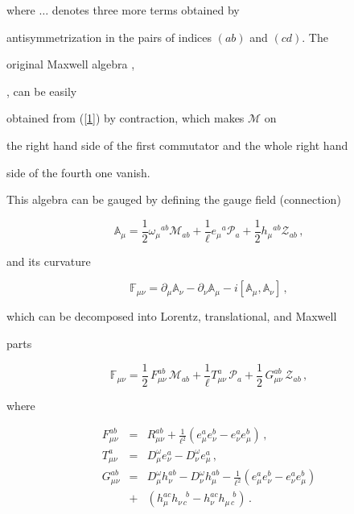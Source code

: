 \documentclass [prd,reprint,eqsecnum,nofootinbib]  {revtex4-1}
\begin{document}
where $\ldots$ denotes three more terms obtained by

antisymmetrization in the pairs of indices $(ab)$ and $(cd)$. The

original Maxwell algebra \cite{Soroka:2006aj},

\cite{Bonanos:2010fw}, \cite{Lukierski:2010dy} can be easily

obtained from (\ref{1}) by contraction, which makes $\mathcal{M}$ on

the right hand side of the first commutator and the whole right hand

side of the fourth one vanish.



This algebra can be gauged by defining the gauge field (connection)

\begin{equation}\label{2}

\mathbb{A}_{\mu}=\frac{1}{2}\omega_\mu{}^{ab}

\mathcal{M}_{ab}+\frac{1}{\ell}e_\mu{}^{a}

\mathcal{P}_{a}+\frac{1}{2}h_\mu{}^{ab} \mathcal{Z}_{ab}\,,

\end{equation}

and its curvature

\begin{equation}\label{3}

\mathbb{F}_{\mu\nu}=\partial_\mu\mathbb{A}_{\nu}-\partial_\nu\mathbb{A}_{\mu}-i[\mathbb{A}_{\mu},\mathbb{A}_{\nu}]\,,

\end{equation}

which can be decomposed into Lorentz, translational, and Maxwell

parts

\begin{equation}\label{4}

\mathbb{F}_{\mu\nu}=\frac12\, F_{\mu\nu}^{ab}\, \mathcal{M}_{ab}

+\frac{1}{\ell}T_{\mu\nu}^{a}\,\mathcal{P}_{a}+ \frac12\,

G_{\mu\nu}^{ab}\, \mathcal{Z}_{ab}\,,

\end{equation}

where

\begin{eqnarray}

F_{\mu\nu}^{ab}&=&R^{ab}_{\mu\nu}+\frac{1}{\ell^2}( e^a_\mu e^b_\nu- e^a_\nu e^b_\mu) \,,\label{5a}\\

T_{\mu\nu}^{a}&=&D^\omega_\mu e^a_\nu -D^\omega_\nu e^a_\mu\,,\label{5b}\\

G_{\mu\nu}^{ab}&=&D^\omega_\mu h^{ab}_\nu -D^\omega_\nu

h^{ab}_\mu\nonumber-\frac{1}{\ell^2}( e^a_\mu e^b_\nu- e^a_\nu

e^b_\mu)\\ &+&(h^{ac}_\mu h^{\quad b}_{\nu\,c}-h^{ac}_\nu h^{\quad

b}_{\mu\,c})\, .\label{5c}

\end{eqnarray}
\end{document}
